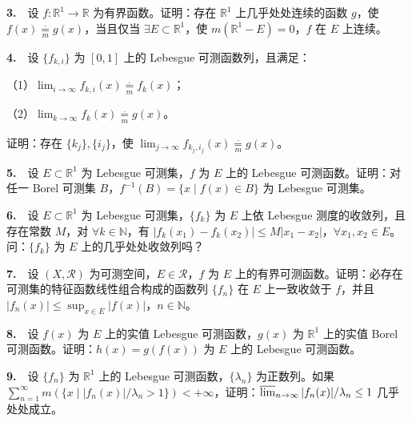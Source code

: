\documentclass[11pt,a4paper]{article}
\begin{document}
\par{}\hypertarget{review3}{}\noindent \textbf{3.}　设 \(f:\mathbb R^1\to\mathbb R\) 为有界函数。证明：存在 \(\mathbb R^1\) 上几乎处处连续的函数 \(g\)，使 \(f(x)\underset{m}{\overset{\cdot}{=}} g(x)\)，当且仅当 \(\exists E\subset\mathbb R^1\)，使 \(m(\mathbb R^1-E)=0\)，\(f\) 在 \(E\) 上连续。

\par{}\hypertarget{review4}{}\noindent \textbf{4.}　设 \(\{f_{k,i}\}\) 为 \([0,1]\) 上的 Lebesgue 可测函数列，且满足：

（1）\(\lim_{i\to\infty} f_{k,i}(x)\underset{m}{\overset{\cdot}{=}} f_k(x)\)；

（2）\(\lim_{k\to\infty} f_k(x)\underset{m}{\overset{\cdot}{=}} g(x)\)。

证明：存在 \(\{k_j\},\{i_j\}\)，使 \(\lim_{j\to\infty}f_{k_j,i_j}(x)\underset{m}{\overset{\cdot}{=}} g(x)\)。

\par{}\hypertarget{review5}{}\noindent \textbf{5.}　设 \(E\subset\mathbb R^1\) 为 Lebesgue 可测集，\(f\) 为 \(E\) 上的 Lebesgue 可测函数。证明：对任一 Borel 可测集 \(B\)，\(f^{-1}(B)=\{x\mid f(x)\in B\}\) 为 Lebesgue 可测集。

\par{}\hypertarget{review6}{}\noindent \textbf{6.}　设 \(E\subset\mathbb R^1\) 为 Lebesgue 可测集，\(\{f_k\}\) 为 \(E\) 上依 Lebesgue 测度的收敛列，且存在常数 \(M\)，对 \(\forall k\in\mathbb N\)，有 \(|f_k(x_1)-f_k(x_2)|\le M|x_1-x_2|\)，\(\forall x_1,x_2\in E\)。问：\(\{f_k\}\) 为 \(E\) 上的几乎处处收敛列吗？

\par{}\hypertarget{review7}{}\noindent \textbf{7.}　设 \((X,\mathcal R)\) 为可测空间，\(E\in\mathcal R\)，\(f\) 为 \(E\) 上的有界可测函数。证明：必存在可测集的特征函数线性组合构成的函数列 \(\{f_n\}\) 在 \(E\) 上一致收敛于 \(f\)，并且 \(|f_n(x)|\le\sup_{x\in E}|f(x)|\)，\(n\in\mathbb N\)。

\par{}\hypertarget{review8}{}\noindent \textbf{8.}　设 \(f(x)\) 为 \(E\) 上的实值 Lebesgue 可测函数，\(g(x)\) 为 \(\mathbb R^1\) 上的实值 Borel 可测函数。证明：\(h(x)=g(f(x))\) 为 \(E\) 上的 Lebesgue 可测函数。

\par{}\hypertarget{review9}{}\noindent \textbf{9.}　设 \(\{f_n\}\) 为 \(\mathbb R^1\) 上的 Lebesgue 可测函数，\(\{\lambda_n\}\) 为正数列。如果 \(\sum_{n=1}^\infty m(\{x\mid |f_n(x)|/\lambda_n>1\})<+\infty\)，证明：\(\varlimsup_{n\to\infty}|f_n(x)|/\lambda_n\le1\) 几乎处处成立。
\end{document}
